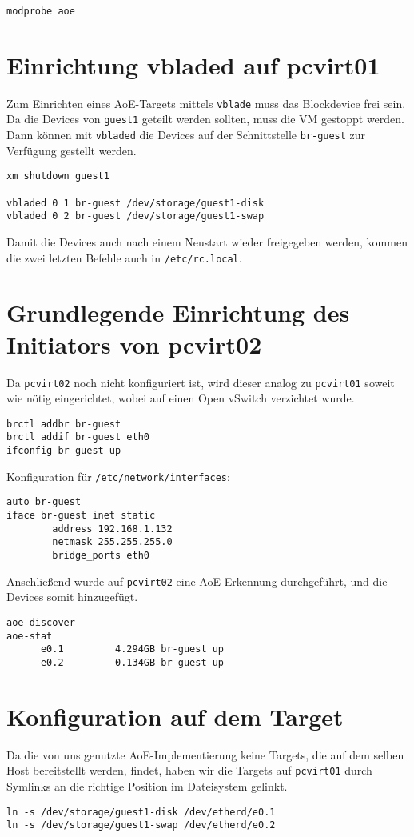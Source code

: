 \begin{verbatim} 
modprobe aoe
\end{verbatim}

\section{Einrichtung vbladed auf pcvirt01}
Zum Einrichten eines AoE-Targets mittels \verb#vblade# muss das Blockdevice frei sein. Da die Devices von \verb#guest1# geteilt werden sollten, muss die VM gestoppt werden. Dann können mit \verb#vbladed# die Devices auf der Schnittstelle \verb#br-guest# zur Verfügung gestellt werden. 
\setupVerbatimOut
\begin{verbatim}
xm shutdown guest1

vbladed 0 1 br-guest /dev/storage/guest1-disk  
vbladed 0 2 br-guest /dev/storage/guest1-swap
\end{verbatim}
Damit die Devices auch nach einem Neustart wieder freigegeben werden, kommen die zwei letzten Befehle auch in \verb#/etc/rc.local#. 
\section{Grundlegende Einrichtung des Initiators von pcvirt02}
Da \verb#pcvirt02# noch nicht konfiguriert ist, wird dieser analog zu \verb#pcvirt01# soweit wie nötig eingerichtet, wobei auf einen Open vSwitch verzichtet wurde.
\begin{verbatim}
brctl addbr br-guest
brctl addif br-guest eth0
ifconfig br-guest up
\end{verbatim}
Konfiguration für \verb#/etc/network/interfaces#:
\setupVerbatimOut
\begin{verbatim}
auto br-guest
iface br-guest inet static
        address 192.168.1.132
        netmask 255.255.255.0
        bridge_ports eth0
\end{verbatim}

Anschließend wurde auf \verb#pcvirt02# eine AoE Erkennung durchgeführt, und die Devices somit hinzugefügt.
\setupVerbatimOut
\begin{verbatim}
aoe-discover 
aoe-stat 
      e0.1         4.294GB br-guest up 
      e0.2         0.134GB br-guest up  
\end{verbatim}

\section{Konfiguration auf dem Target}
Da die von uns genutzte AoE-Implementierung keine Targets, die auf dem selben Host bereitstellt werden, findet, haben wir die Targets auf \verb#pcvirt01# durch Symlinks an die richtige Position im Dateisystem gelinkt.
\setupVerbatimOut
\begin{verbatim}
ln -s /dev/storage/guest1-disk /dev/etherd/e0.1
ln -s /dev/storage/guest1-swap /dev/etherd/e0.2 
\end{verbatim}

